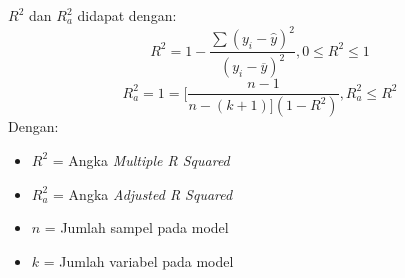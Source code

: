 \begin{enumerate}
\begin{enumerate}
    $R^2$ dan $R^2_a$ didapat dengan:
    \begin{equation*}
        R^2 = 1 - \frac{\sum (y_i - \hat{y})^2}{(y_i - \overline{y})^2} , 0 \leq R^2 \leq 1
    \end{equation*}
    \begin{equation*}
        R^2_a = 1 = [\frac{n - 1}{n - (k + 1)](1 - R^2)}, R^2_a \leq R^2
    \end{equation*}
    Dengan:
    \begin{itemize}
        \item $R^2$ = Angka \textit{Multiple R Squared}
        \item $R^2_a$ = Angka \textit{Adjusted R Squared}
        \item $n$ = Jumlah sampel pada model
        \item $k$ = Jumlah variabel pada model
    \end{itemize}
\end{enumerate}

\end{enumerate}
